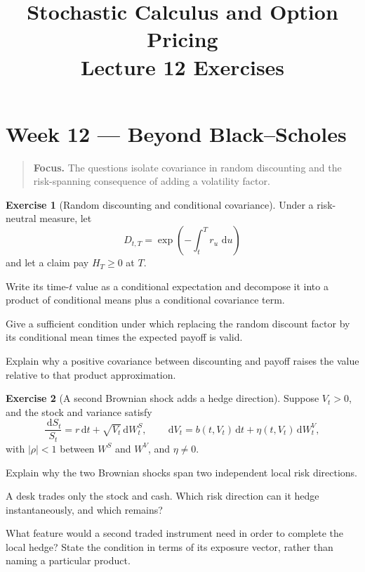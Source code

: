 \documentclass[11pt]{article}
\title{Stochastic Calculus and Option Pricing\\Lecture 12 Exercises}
\author{}
\date{}
\newcommand{\dd}{\,\mathrm d}
\theoremstyle{definition}
\newtheorem{exercise}{Exercise}[section]
\newcommand{\lecturesummary}[1]{\begin{quote}\small\textbf{Focus.} #1\end{quote}}
\begin{document}
\maketitle
\vspace{-1.2em}
\setcounter{section}{11}
\fi

\section{Week 12 --- Beyond Black--Scholes}
\lecturesummary{The questions isolate covariance in random discounting and
the risk-spanning consequence of adding a volatility factor.}

\begin{exercise}[Random discounting and conditional covariance]
Under a risk-neutral measure, let
\[
D_{t,T}=\exp\left(-\int_t^T r_u\,\dd u\right)
\]
and let a claim pay \(H_T\geq0\) at \(T\).
\begin{exparts}
  \item Write its time-\(t\) value as a conditional expectation and
  decompose it into a product of conditional means plus a conditional
  covariance term.
  \item Give a sufficient condition under which replacing the random
  discount factor by its conditional mean times the expected payoff is
  valid.
  \item Explain why a positive covariance between discounting and payoff
  raises the value relative to that product approximation.
\end{exparts}
\end{exercise}

\begin{exercise}[A second Brownian shock adds a hedge direction]
Suppose \(V_t>0\), and the stock and variance satisfy
\[
\frac{\dd S_t}{S_t}=r\dd t+\sqrt{V_t}\dd W_t^S,\qquad
\dd V_t=b(t,V_t)\dd t+\eta(t,V_t)\dd W_t^V,
\]
with \(|\rho|<1\) between \(W^S\) and \(W^V\), and \(\eta\ne0\).
\begin{exparts}
  \item Explain why the two Brownian shocks span two independent local
  risk directions.
  \item A desk trades only the stock and cash. Which risk direction can it
  hedge instantaneously, and which remains?
  \item What feature would a second traded instrument need in order to
  complete the local hedge? State the condition in terms of its exposure
  vector, rather than naming a particular product.
\end{exparts}
\end{exercise}

\ifdefined\ExercisesSynthesis\else
\end{document}
